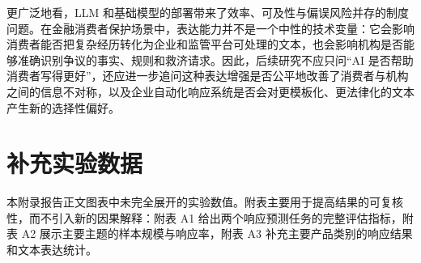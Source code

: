 \documentclass[UTF8]{ctexart}
\begin{document}
更广泛地看，LLM 和基础模型的部署带来了效率、可及性与偏误风险并存的制度问题\cite{ouyang2022instructgpt,bommasani2021foundation,bender2021stochastic}。在金融消费者保护场景中，表达能力并不是一个中性的技术变量：它会影响消费者能否把复杂经历转化为企业和监管平台可处理的文本，也会影响机构是否能够准确识别争议的事实、规则和救济请求。因此，后续研究不应只问“AI 是否帮助消费者写得更好”，还应进一步追问这种表达增强是否公平地改善了消费者与机构之间的信息不对称，以及企业自动化响应系统是否会对更模板化、更法律化的文本产生新的选择性偏好。




\clearpage
\appendix
\setcounter{table}{0}
\renewcommand{\thetable}{A\arabic{table}}
\section{补充实验数据}

本附录报告正文图表中未完全展开的实验数值。附表主要用于提高结果的可复核性，而不引入新的因果解释：附表 A1 给出两个响应预测任务的完整评估指标，附表 A2 展示主要主题的样本规模与响应率，附表 A3 补充主要产品类别的响应结果和文本表达统计。

\begin{table}[H]
  \centering
  \scriptsize
  \caption{响应预测模型的补充评估指标}
  \label{tab:appendix-model-metrics}
\end{table}
\end{document}
